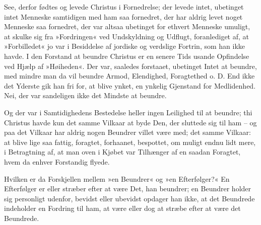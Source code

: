 \documentclass[12pt,a4paper]{article}
\begin{document}
See, derfor fødtes og levede Christus i Fornedrelse; der levede intet, ubetinget intet Menneske samtidigen med ham saa fornedret, der har aldrig levet noget Menneske saa fornedret, der var altsaa ubetinget for ethvert Menneske umuligt, at skulke sig fra »Fordringen« ved Undskyldning og Udflugt, foranlediget af, at »Forbilledet« jo var i Besiddelse af jordiske og verdslige Fortrin, som han ikke havde. I den Forstand at beundre Christus er en senere Tids usande Opfindelse ved Hjælp af »Høiheden«. Der var, saaledes forstaaet, ubetinget Intet at beundre, med mindre man da vil beundre Armod, Elendighed, Foragtethed o. D. End ikke det Yderste gik han fri for, at blive ynket, en ynkelig Gjenstand for Medlidenhed. Nei, der var sandeligen ikke det Mindste at beundre.

Og der var i Samtidighedens Bestedelse heller ingen Leilighed til at beundre; thi Christus havde kun det samme Vilkaar at byde Den, der sluttede sig til ham – og paa det Vilkaar har aldrig nogen Beundrer villet være med; det samme Vilkaar: at blive lige saa fattig, foragtet, forhaanet, bespottet, om muligt endnu lidt mere, i Betragtning af, at man oven i Kjøbet var Tilhænger af en saadan Foragtet, hvem da enhver Forstandig flyede.

Hvilken er da Forskjellen mellem »en Beundrer« og »en Efterfølger?« En Efterfølger er eller stræber efter at være Det, han beundrer; en Beundrer holder sig personligt udenfor, bevidst eller ubevidst opdager han ikke, at det Beundrede indeholder en Fordring til ham, at være eller dog at stræbe efter at være det Beundrede.
\end{document}

